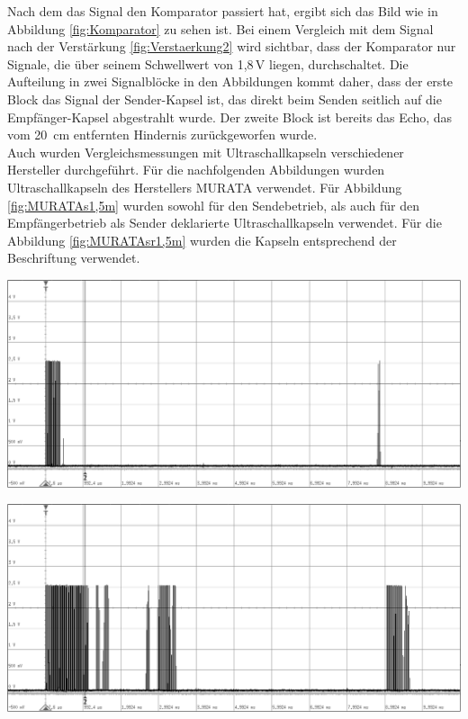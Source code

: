Nach dem das Signal den Komparator passiert hat, ergibt sich das Bild wie in Abbildung \ref{fig:Komparator} zu sehen ist. Bei einem Vergleich mit dem Signal nach der Verstärkung \ref{fig:Verstaerkung2} wird sichtbar, dass der Komparator nur Signale, die über seinem Schwellwert von 1,8\,V liegen, durchschaltet. Die Aufteilung in zwei Signalblöcke in den Abbildungen kommt daher, dass der erste Block das Signal der Sender-Kapsel ist, das direkt beim Senden seitlich auf die Empfänger-Kapsel abgestrahlt wurde. Der zweite Block ist bereits das Echo, das vom 20~cm entfernten Hindernis zurückgeworfen wurde.\\
Auch wurden Vergleichsmessungen mit Ultraschallkapseln verschiedener Hersteller durchgeführt. Für die nachfolgenden Abbildungen wurden  Ultraschallkapseln des Herstellers MURATA verwendet. Für Abbildung \ref{fig:MURATAs1,5m} wurden sowohl für den Sendebetrieb, als auch für den Empfängerbetrieb als Sender deklarierte Ultraschallkapseln verwendet. Für die Abbildung \ref{fig:MURATAsr1,5m} wurden die Kapseln entsprechend der Beschriftung verwendet.\\
\begin{minipage}{0.46\textwidth}
\includegraphics[width=1\textwidth%
]{Abbildungen/MessungenP1/MURATAs1,5m.png}
\label{fig:MURATAs1,5m}
\end{minipage}\qquad
\begin{minipage}{0.46\textwidth}
\includegraphics[width=1\textwidth%
]{Abbildungen/MessungenP1/MURATAsr1,5m.png}
\label{fig:MURATAsr1,5m}
\end{minipage}\\
